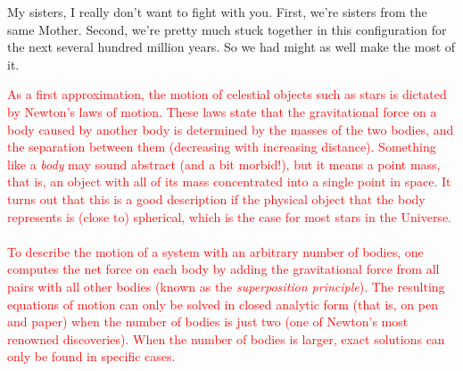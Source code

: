 \documentclass[main.tex]{subfiles}
\begin{document}
\par \Celaeno My sisters, I really don't want to fight with you.  First, we're sisters from the same Mother.  Second, we're pretty much stuck together in this configuration for the next several hundred million years.  So we had might as well make the most of it.

\begin{tcolorbox}[sharp corners, colback=red!30, colframe=red!80!blue, title=Orbital Dynamics Ia]
\par \textcolor{red}{As a first approximation, the motion of celestial objects such as stars is dictated by Newton's laws of motion. These laws state that the gravitational force on a body caused by another body is determined by the masses of the two bodies, and the separation between them (decreasing with increasing distance). Something like a {\it body} may sound abstract (and a bit morbid!), but it means a point mass, that is, an object with all of its mass concentrated into a single point in space. It turns out that this is a good description if the physical object that the body represents is (close to) spherical, which is the case for most stars in the Universe. \\ \\
To describe the motion of a system with an arbitrary number of bodies, one computes the net force on each body by adding the gravitational force from all pairs with all other bodies (known as the {\it superposition principle}). The resulting equations of motion can only be solved in closed analytic form (that is, on pen and paper) when the number of bodies is just two (one of Newton's most renowned discoveries). When the number of bodies is larger, exact solutions can only be found in specific cases. 
}
\end{tcolorbox}
\end{document}
